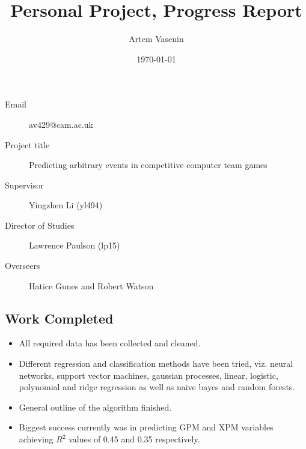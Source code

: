 \documentclass[11pt, a4paper]{article}
\title{Personal Project, Progress Report}
\date{\today}
\author{Artem Vasenin}
\begin{document}
\maketitle


\begin{description}
\item[Email] av429@cam.ac.uk
\item[Project title] Predicting arbitrary events in competitive computer team games
\item[Supervisor] Yingzhen Li (yl494)
\item[Director of Studies] Lawrence Paulson (lp15)
\item[Overseers] Hatice Gunes and Robert Watson
\end{description}

\subsection*{Work Completed}
\begin{itemize}
\item All required data has been collected and cleaned.
\item Different regression and classification methods have been tried, viz. neural networks, support vector machines, gaussian processes, linear, logistic, polynomial and ridge regression as well as naive bayes and random forests.
\item General outline of the algorithm finished.
\item Biggest success currently was in predicting GPM and XPM variables achieving $R^2$ values of 0.45 and 0.35 respectively.
\end{itemize}
\end{document}
